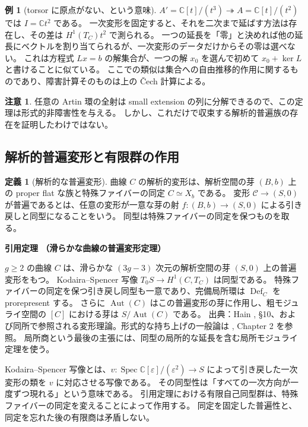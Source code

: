 \documentclass[dvipdfmx,a4paper,11pt]{article}
\theoremstyle{definition}
\newtheorem{dfn}[thm]{定義}
\newtheorem{exa}[thm]{例}
\newtheorem{rem}[thm]{注意}
\newcommand{\C}{\mathbb C}\newcommand{\R}{\mathbb R}\newcommand{\Z}{\mathbb Z}\newcommand{\Q}{\mathbb Q}
\DeclareMathOperator{\Aut}{Aut}\DeclareMathOperator{\Pic}{Pic}\DeclareMathOperator{\Hom}{Hom}
\DeclareMathOperator{\Spec}{Spec}\DeclareMathOperator{\Proj}{Proj}\DeclareMathOperator{\GL}{GL}
\newcommand{\Def}{\operatorname{Def}}
\newcommand{\eps}{\varepsilon}
\newenvironment{external}[1]{\Needspace{7\baselineskip}\refstepcounter{thm}\begin{tcolorbox}[mybox,colback=blue!2,colframe=blue!40!black]\textbf{引用定理 \thethm（#1）}\par}{\end{tcolorbox}}
\begin{document}
\begin{exa}[torsor に原点がない、という意味]
$A'=\C[t]/(t^3)\twoheadrightarrow A=\C[t]/(t^2)$ では $I=\C t^2$ である。
一次変形を固定すると、それを二次まで延ばす方法は存在し、その差は $H^1(T_C)t^2$ で測られる。
一つの延長を「零」と決めれば他の延長にベクトルを割り当てられるが、一次変形のデータだけからその零は選べない。
これは方程式 $Lx=b$ の解集合が、一つの解 $x_0$ を選んで初めて $x_0+\ker L$ と書けることに似ている。
ここでの類似は集合への自由推移的作用に関するものであり、障害計算そのものは上の Čech 計算による。
\end{exa}

\begin{rem}
任意の Artin 環の全射は small extension の列に分解できるので、この定理は形式的非障害性を与える。
しかし、これだけで収束する解析的普遍族の存在を証明したわけではない。
\end{rem}

\subsection{解析的普遍変形と有限群の作用}
\begin{dfn}[解析的な普遍変形]
曲線 $C$ の解析的変形は、解析空間の芽 $(B,b)$ 上の proper flat な族と特殊ファイバーの同定 $C\simeq X_b$ である。
変形 $\mathscr C\to(S,0)$ が普遍であるとは、任意の変形が一意な芽の射 $f:(B,b)\to(S,0)$ による引き戻しと同型になることをいう。
同型は特殊ファイバーの同定を保つものを取る。
\end{dfn}
\begin{external}{滑らかな曲線の普遍変形定理}\label{input:kuranishi}
$g\ge2$ の曲線 $C$ は、滑らかな $(3g-3)$ 次元の解析空間の芽 $(S,0)$ 上の普遍変形をもつ。
Kodaira--Spencer 写像
$T_0S\to H^1(C,T_C)$ は同型である。
特殊ファイバーの同定を保つ引き戻し同型も一意であり、完備局所環は $\Def_C$ を prorepresent する。
さらに $\Aut(C)$ はこの普遍変形の芽に作用し、粗モジュライ空間の $[C]$ における芽は $S/\Aut(C)$ である。
出典：Hain \cite{Hain}, \S10、および同所で参照される変形理論。形式的な持ち上げの一般論は \cite{Sernesi}, Chapter 2 を参照。
局所商という最後の主張には、同型の局所的な延長を含む局所モジュライ定理を使う。
\end{external}
Kodaira--Spencer 写像とは、$v:\Spec\C[\eps]/(\eps^2)\to S$ によって引き戻した一次変形の類を $v$ に対応させる写像である。
その同型性は「すべての一次方向が一度ずつ現れる」という意味である。
引用定理における有限自己同型群は、特殊ファイバーの同定を変えることによって作用する。
同定を固定した普遍性と、同定を忘れた後の有限商は矛盾しない。
\end{document}
